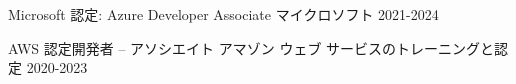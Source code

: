

\begin{cvhonors}

  \cvhonor
    {Microsoft 認定: Azure Developer Associate} %
    {マイクロソフト} %
    {} %
    {2021-2024} %

  \cvhonor
    {AWS 認定開発者 – アソシエイト} %
    {アマゾン ウェブ サービスのトレーニングと認定} %
    {} %
    {2020-2023} %

\end{cvhonors}
